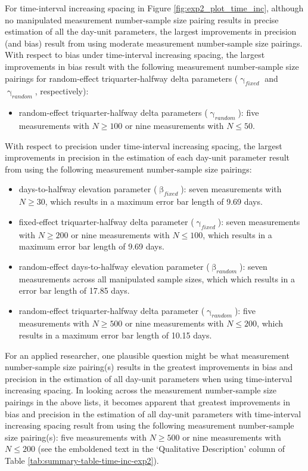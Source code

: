 \documentclass[
12pt, %
twoside,
english]{guelphthesis}
\theoremstyle{definition}
\theoremstyle{definition}
\theoremstyle{definition}
\theoremstyle{definition}
\theoremstyle{remark}
\begin{document}
For time-interval increasing spacing in Figure \ref{fig:exp2_plot_time_inc}, although no manipulated measurement number-sample size pairing results in precise estimation of all the day-unit parameters, the largest improvements in precision (and bias) result from using moderate measurement number-sample size pairings. With respect to bias under time-interval increasing spacing, the largest improvements in bias result with the following measurement number-sample size pairings for random-effect triquarter-halfway delta parameters (\(\upgamma_{fixed}\) and \(\upgamma_{random}\), respectively):
\begin{itemize}
\tightlist
\item
  random-effect triquarter-halfway delta parameters (\(\upgamma_{random}\)): five measurements with \(N \ge 100\) or nine measurements with \(N \le 50\).
\end{itemize}
\noindent With respect to precision under time-interval increasing spacing, the largest improvements in precision in the estimation of each day-unit parameter result from using the following measurement number-sample size pairings:
\begin{itemize}
\tightlist
\item
  days-to-halfway elevation parameter (\(\upbeta_{fixed}\)): seven measurements with \(N \ge 30\), which results in a maximum error bar length of 9.69 days.
\item
  fixed-effect triquarter-halfway delta parameter (\(\upgamma_{fixed}\)): seven measurements with \(N \ge 200\) or nine measurements with \(N \le 100\), which results in a maximum error bar length of 9.69 days.
\item
  random-effect days-to-halfway elevation parameter (\(\upbeta_{random}\)): seven measurements across all manipulated sample sizes, which which results in a error bar length of 17.85 days.
\item
  random-effect triquarter-halfway delta parameter (\(\upgamma_{random}\)): five measurements with \(N \ge 500\) or nine measurements with \(N \le 200\), which results in a maximum error bar length of 10.15 days.
\end{itemize}
For an applied researcher, one plausible question might be what measurement number-sample size pairing(s) results in the greatest improvements in bias and precision in the estimation of all day-unit parameters when using time-interval increasing spacing. In looking across the measurement number-sample size pairings in the above lists, it becomes apparent that greatest improvements in bias and precision in the estimation of all day-unit parameters with time-interval increasing spacing result from using the following measurement number-sample size pairing(s): five measurements with \(N \ge 500\) or nine measurements with \(N \le 200\) (see the emboldened text in the `Qualitative Description' column of Table \ref{tab:summary-table-time-inc-exp2}).
\end{document}
